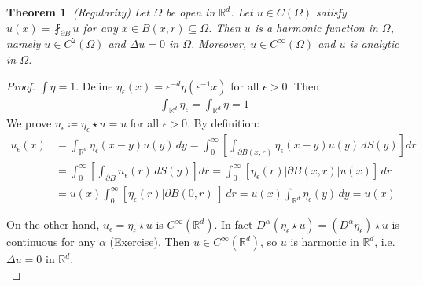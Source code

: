 \documentclass{report}
\theoremstyle{tommy}
\newtheorem{thm}[defn]{Theorem}
\begin{document}
\begin{thm} (Regularity)
  Let \(\Omega\) be open in \(\mathbb{R}^d\). Let \(u \in C(\Omega)\) satisfy \(u(x) = \fint_{\partial B} u\) for any \(x \in B(x, r) \subseteq \Omega\). Then \(u\) is a harmonic function in \(\Omega\), namely \(u \in C^2(\Omega)\) and \(\Delta u = 0\) in \(\Omega\). Moreover, \(u \in C^\infty(\Omega)\) and \(u\) is analytic in \(\Omega\).
\end{thm}

\begin{proof}
  \(\int \eta = 1\). Define \(\eta_\epsilon (x) = \epsilon^{-d} \eta(\epsilon^{-1} x)\) for all \(\epsilon > 0\). Then
  \begin{align*}
    \int_{\mathbb{R}^d} \eta_\epsilon = \int_{\mathbb{R}^d} \eta = 1
  \end{align*}
  We prove \(u_\epsilon \coloneqq \eta_\epsilon \star u = u\) for all \(\epsilon > 0\). By definition:
  \begin{align*}
    u_\epsilon(x) 
    &= \int_{\mathbb{R}^d} \eta_\epsilon(x-y)u(y) \, dy 
    = \int_0^\infty \left[\int_{\partial B(x, r)} \eta_\epsilon(x-y) u(y) \, dS(y)\right] dr \\
    &= \int_0^\infty \left[\int_{\partial B} n_\epsilon(r) \, dS(y)\right] dr
    = \int_0^\infty \left[\eta_\epsilon(r) |\partial B(x, r)| u(x) \right] \, dr \\
    &= u(x) \int_0^\infty \left[\eta_\epsilon(r) |\partial B(0, r)|\right] \, dr = u(x) \int_{\mathbb{R}^d} \eta_\epsilon(y) \, dy = u(x)
  \end{align*}

  On the other hand, \(u_\epsilon = \eta_\epsilon \star u\) is \(C^\infty(\mathbb{R}^d)\). In fact \(D^\alpha(\eta_\epsilon \star u) = (D^\alpha \eta_\epsilon) \star u\) is continuous for any \(\alpha\) (Exercise). Then \(u \in C^\infty(\mathbb{R}^d)\), so \(u\) is harmonic in \(\mathbb{R}^d\), i.e. \(\Delta u = 0\) in \(\mathbb{R}^d\). \\


\end{proof}
\end{document}
